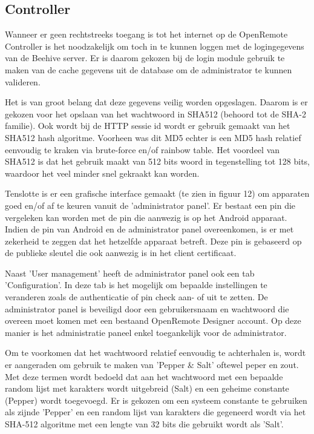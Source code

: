\documentclass[]{article}
\begin{document}
\subsection{Controller}
Wanneer er geen rechtstreeks toegang is tot het internet op de 
OpenRemote Controller is het noodzakelijk om toch in te kunnen loggen met de
logingegevens van de Beehive server. Er is daarom gekozen bij de login module
gebruik te maken van de cache gegevens uit de database om de administrator te
kunnen valideren.

Het is van groot belang dat deze gegevens veilig worden opgeslagen. Daarom is er
gekozen voor het opslaan van het wachtwoord in SHA512 (behoord tot de SHA-2
familie). Ook wordt bij de HTTP sessie id  wordt er gebruik gemaakt van het SHA512
hash algoritme. Voorheen was dit MD5 echter is een MD5 hash relatief
eenvoudig te kraken via brute-force en/of rainbow table. Het voordeel van SHA512
is dat het gebruik maakt van 512 bits woord in tegenstelling tot 128
bits, waardoor het veel minder snel gekraakt kan worden.

Tenslotte is er een grafische interface gemaakt (te zien in figuur 12) om
apparaten goed en/of af te keuren vanuit de 'administrator panel'. Er bestaat
een pin die vergeleken kan worden met de pin die aanwezig is op het Android
apparaat. Indien de pin van Android en de administrator panel overeenkomen, is
er met zekerheid te zeggen dat het hetzelfde apparaat betreft. Deze pin is
gebaseerd op de publieke sleutel die ook aanwezig is in het client certificaat.

Naast 'User management' heeft de administrator panel ook een tab
'Configuration'. In deze tab is het mogelijk om bepaalde instellingen te
veranderen zoals de authenticatie of pin check aan- of uit te zetten.  De
administrator panel is beveiligd door een gebruikersnaam en wachtwoord die
overeen moet komen met een bestaand OpenRemote Designer account. Op deze manier
is het administratie paneel enkel toegankelijk voor de administrator.

Om te voorkomen dat het wachtwoord relatief eenvoudig te achterhalen is, wordt
er aangeraden om gebruik te maken van 'Pepper \& Salt' oftewel peper en zout. Met
deze termen wordt bedoeld dat aan het wachtwoord met een bepaalde random lijst
met karakters wordt uitgebreid  (Salt) en een geheime constante (Pepper) wordt
toegevoegd. Er is gekozen om een systeem constante te gebruiken als zijnde
'Pepper' en een random lijst van karakters die gegeneerd wordt via het SHA-512
algoritme met een lengte van 32 bits die gebruikt wordt als 'Salt'. 
\end{document}
